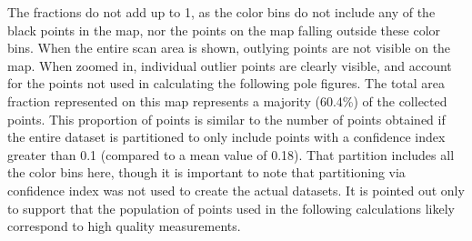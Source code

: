 \documentclass[12pt,%
              twoside,
               letterpaper]{uiothesis}
\begin{document}
%	
%		
%
%
%	
%		
%		
%		
%		
%		
%
The fractions do not add up to 1, as the color bins do not include any of the black points
in the map, nor the points on the map falling outside these color bins. When the entire
scan area is shown, outlying points are not visible on the map. When zoomed in, individual
outlier points are clearly visible, and account for the points not used in calculating the
following pole figures. The total area fraction represented on this map represents a 
majority (60.4\%) of the collected points. This proportion of points is similar to the number of
points obtained if the entire dataset is partitioned to only include points with a confidence
index greater than 0.1 (compared to a mean value of 0.18). That partition includes all the color
bins here, though it is important to note that partitioning via confidence index was not
used to create the actual datasets. It is pointed out only to support that the population of
points used in the following calculations likely correspond to high quality measurements.
\end{document}
